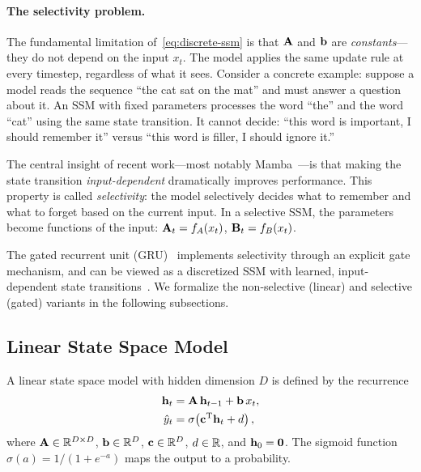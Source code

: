 \documentclass[11pt]{article}
\newcommand\hh{\mathbf{h}}
\newcommand{\sigmoid}{\sigma}
\begin{document}
\paragraph{The selectivity problem.}
The fundamental limitation of~\eqref{eq:discrete-ssm} is that $\AA$ and $\bb$ are \emph{constants}---they do not depend on the input $x_t$.
The model applies the same update rule at every timestep, regardless of what it sees.
Consider a concrete example: suppose a model reads the sequence ``the cat sat on the mat'' and must answer a question about it.
An SSM with fixed parameters processes the word ``the'' and the word ``cat'' using the same state transition.
It cannot decide: ``this word is important, I should remember it'' versus ``this word is filler, I should ignore it.''

The central insight of recent work---most notably Mamba~\citep{gu2023mamba}---is that making the state transition \emph{input-dependent} dramatically improves performance.
This property is called \emph{selectivity}: the model selectively decides what to remember and what to forget based on the current input.
In a selective SSM, the parameters become functions of the input: $\AA_t = f_A(x_t)$, $\BB_t = f_B(x_t)$.

The gated recurrent unit (GRU)~\citep{cho2014learning} implements selectivity through an explicit gate mechanism, and can be viewed as a discretized SSM with learned, input-dependent state transitions~\citep{gu2023mamba, orvieto2023resurrecting}.
We formalize the non-selective (linear) and selective (gated) variants in the following subsections.


\subsection{Linear State Space Model}
\label{sec:linear-ssm}

\begin{definition}
\label{def:linear-ssm}
A linear state space model with hidden dimension $D$ is defined by the recurrence
\begin{align}
    \hh_t &= \AA\, \hh_{t-1} + \bb\, x_t, \label{eq:linear-state}\\
    \hat{y}_t &= \sigmoid\!\rb{\cc^\transpose \hh_t + d}, \label{eq:linear-output}
\end{align}
where $\AA \in \R^{D \times D}$, $\bb \in \R^D$, $\cc \in \R^D$, $d \in \R$, and $\hh_0 = \zeroVec$.
The sigmoid function $\sigmoid(a) = 1/(1+e^{-a})$ maps the output to a probability.
\end{definition}
\end{document}
